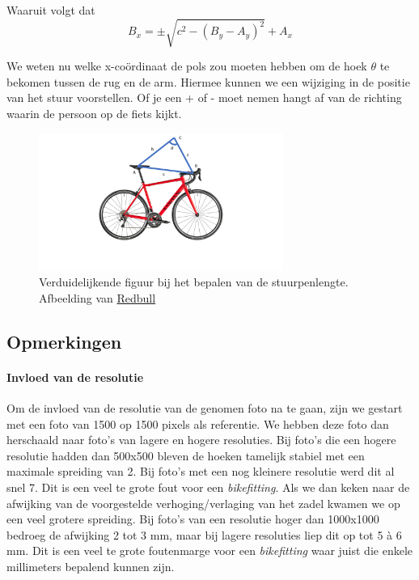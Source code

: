 \documentclass[a4paper,twoside,kulak]{kulakreport}
\begin{document}
Waaruit volgt dat
\[B_x = \pm \sqrt{c^2 -(B_y - A_y)^2 } + A_x\]

We weten nu welke x-coördinaat de pols zou moeten hebben om de hoek $\theta$ te bekomen tussen de rug en de arm. Hiermee kunnen we een wijziging in de positie van het stuur voorstellen. Of je een + of - moet nemen hangt af van de richting waarin de persoon op de fiets kijkt.
\begin{figure}[H]
	\begin{center}
		\includegraphics[width=8cm]{yeye.pdf}
	\end{center}
	\caption{Verduidelijkende figuur bij het bepalen van de stuurpenlengte. Afbeelding van \href{redbull.com}{Redbull}}
	\label{stuurpenlengte}
\end{figure}

\subsection{Opmerkingen}

\paragraph{Invloed van de resolutie}
Om de invloed van de resolutie van de genomen foto na te gaan, zijn we gestart met een foto van 1500 op 1500 pixels als referentie. We hebben deze foto dan herschaald naar foto's van lagere en hogere resoluties. Bij foto's die een hogere resolutie hadden dan 500x500 bleven de hoeken tamelijk stabiel met een maximale spreiding van 2\degree. Bij foto's met een nog kleinere resolutie werd dit al snel 7\degree. Dit is een veel te grote fout voor een \textit{bikefitting}. Als we dan keken naar de afwijking van de voorgestelde verhoging/verlaging van het zadel kwamen we op een veel grotere spreiding. Bij foto's van een resolutie hoger dan 1000x1000 bedroeg de afwijking 2 tot 3 \si{mm}, maar bij lagere resoluties liep dit op tot 5 à 6 \si{mm}. Dit is een veel te grote foutenmarge voor een \textit{bikefitting} waar juist die enkele millimeters bepalend kunnen zijn.
\end{document}
